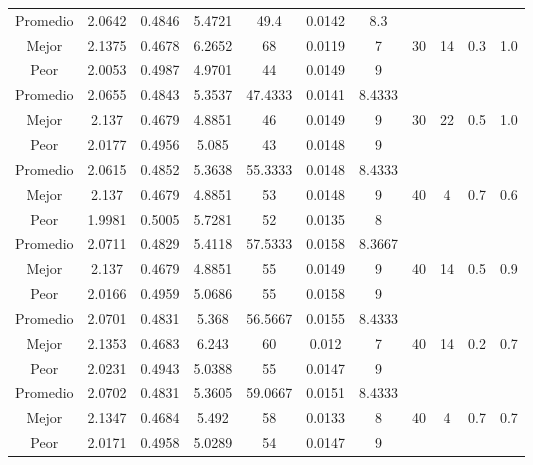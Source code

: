 \begin{table}[h!]
\begin{center}
\begin{tabular}{|c|c|c|c|c|c|c|c|c|c|c|}
        \hline
        \hline
            Promedio  & 2.0642 & 0.4846 & 5.4721 & 49.4 & 0.0142 & 8.3 &  &  &  & \\
            \cline{1-7}
            Mejor & 2.1375 & 0.4678  & 6.2652 & 68 & 0.0119 & 7 & 30 & 14 & 0.3 & 1.0\\
            \cline{1-7}
            Peor & 2.0053 & 0.4987  & 4.9701 & 44 & 0.0149 & 9 &  &  &  & \\
        \hline
        \hline
            Promedio  & 2.0655 & 0.4843 & 5.3537 & 47.4333 & 0.0141 & 8.4333 &  &  &  & \\
            \cline{1-7}
            Mejor & 2.137 & 0.4679  & 4.8851 & 46 & 0.0149 & 9 & 30 & 22 & 0.5 & 1.0\\
            \cline{1-7}
            Peor & 2.0177 & 0.4956  & 5.085 & 43 & 0.0148 & 9 &  &  &  & \\
        \hline
        \hline
            Promedio  & 2.0615 & 0.4852 & 5.3638 & 55.3333 & 0.0148 & 8.4333 &  &  &  & \\
            \cline{1-7}
            Mejor & 2.137 & 0.4679  & 4.8851 & 53 & 0.0148 & 9 & 40 & 4 & 0.7 & 0.6\\
            \cline{1-7}
            Peor & 1.9981 & 0.5005  & 5.7281 & 52 & 0.0135 & 8 &  &  &  & \\
        \hline
        \hline
            Promedio  & 2.0711 & 0.4829 & 5.4118 & 57.5333 & 0.0158 & 8.3667 &  &  &  & \\
            \cline{1-7}
            Mejor & 2.137 & 0.4679  & 4.8851 & 55 & 0.0149 & 9 & 40 & 14 & 0.5 & 0.9\\
            \cline{1-7}
            Peor & 2.0166 & 0.4959  & 5.0686 & 55 & 0.0158 & 9 &  &  &  & \\
        \hline
        \hline
            Promedio  & 2.0701 & 0.4831 & 5.368 & 56.5667 & 0.0155 & 8.4333 &  &  &  & \\
            \cline{1-7}
            Mejor & 2.1353 & 0.4683  & 6.243 & 60 & 0.012 & 7 & 40 & 14 & 0.2 & 0.7\\
            \cline{1-7}
            Peor & 2.0231 & 0.4943  & 5.0388 & 55 & 0.0147 & 9 &  &  &  & \\
        \hline
        \hline
            Promedio  & 2.0702 & 0.4831 & 5.3605 & 59.0667 & 0.0151 & 8.4333 &  &  &  & \\
            \cline{1-7}
            Mejor & 2.1347 & 0.4684  & 5.492 & 58 & 0.0133 & 8 & 40 & 4 & 0.7 & 0.7\\
            \cline{1-7}
            Peor & 2.0171 & 0.4958  & 5.0289 & 54 & 0.0147 & 9 &  &  &  & \\

\end{tabular}
\end{center}
\end{table}
